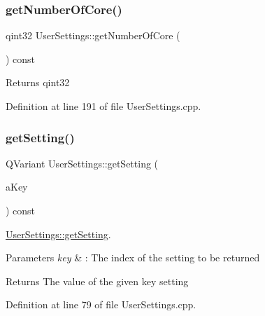 \mbox{\label{class_user_settings_a16bb4d9a4366ca2b3196d229147f6c71}} 
\subsubsection{\texorpdfstring{get\+Number\+Of\+Core()}{getNumberOfCore()}}
{\footnotesize\ttfamily qint32 User\+Settings\+::get\+Number\+Of\+Core (\begin{DoxyParamCaption}{ }\end{DoxyParamCaption}) const}

\begin{DoxyReturn}{Returns}
qint32 
\end{DoxyReturn}


Definition at line 191 of file User\+Settings.\+cpp.

\mbox{\label{class_user_settings_a527dda1694c70dc98f06cd5f8a0cd38b}} 
\subsubsection{\texorpdfstring{get\+Setting()}{getSetting()}}
{\footnotesize\ttfamily Q\+Variant User\+Settings\+::get\+Setting (\begin{DoxyParamCaption}\item[{const Q\+String \&}]{a\+Key }\end{DoxyParamCaption}) const}



\hyperlink{class_user_settings_a527dda1694c70dc98f06cd5f8a0cd38b}{User\+Settings\+::get\+Setting}. 


\begin{DoxyParams}{Parameters}
{\em key} & \+: The index of the setting to be returned \\
\hline
\end{DoxyParams}
\begin{DoxyReturn}{Returns}
The value of the given key setting 
\end{DoxyReturn}


Definition at line 79 of file User\+Settings.\+cpp.

\mbox{\label{class_user_settings_acf4e409e75947f7002872e296bed933b}} 
